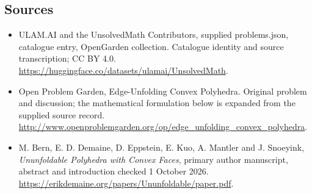 \documentclass[11pt,a4paper]{article}
\begin{document}
\subsection{Sources}
\begin{itemize}
\item[S1] ULAM.AI and the UnsolvedMath Contributors, supplied problems.json, catalogue entry, OpenGarden collection. Catalogue identity and source transcription; CC BY 4.0.
\url{https://huggingface.co/datasets/ulamai/UnsolvedMath}.
\item[S2] Open Problem Garden, Edge-Unfolding Convex Polyhedra. Original problem and discussion; the mathematical formulation below is expanded from the supplied source record.
\url{http://www.openproblemgarden.org/op/edge_unfolding_convex_polyhedra}.
\item[A1] M. Bern, E. D. Demaine, D. Eppstein, E. Kuo, A. Mantler and J. Snoeyink, \emph{Ununfoldable Polyhedra with Convex Faces}, primary author manuscript, abstract and introduction checked 1 October 2026. \url{https://erikdemaine.org/papers/Ununfoldable/paper.pdf}.
\end{itemize}
\end{document}
